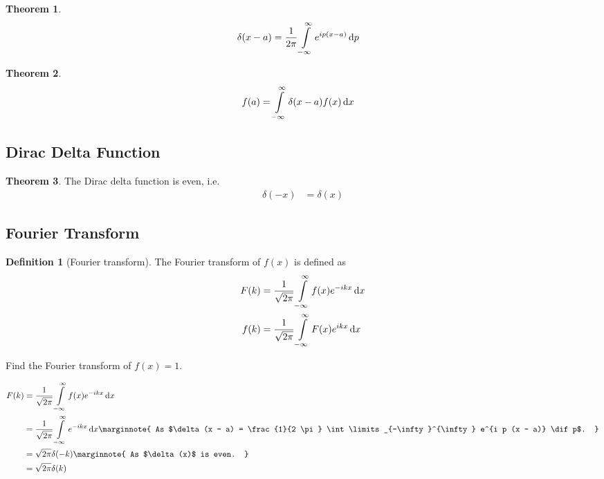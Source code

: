 \documentclass[titlepage, fleqn, a4paper, 12pt, twoside]{article}
\theoremstyle{definition}
\newtheorem{definition}{Definition}
\theoremstyle{theorem}
\newtheorem{theorem}{Theorem}
\begin{document}
\begin{theorem}
	\begin{align*}
		\delta(x - a) &= \frac{1}{2 \pi} \int\limits_{-\infty}^{\infty} e^{i p (x - a)} \dif p
	\end{align*}
\end{theorem}

\begin{theorem}
	\begin{align*}
		f(a) &= \int\limits_{-\infty}^{\infty} \delta(x - a) f(x) \dif x
	\end{align*}
\end{theorem}

\subsection{Dirac Delta Function}

\begin{theorem}
	The Dirac delta function is even, i.e.
	\begin{align*}
		\delta(-x) &= \delta(x)
	\end{align*}
\end{theorem}

\subsection{Fourier Transform}

\begin{definition}[Fourier transform]
	The Fourier transform of $f(x)$ is defined as
	\begin{align*}
		F(k) &= \frac{1}{\sqrt{2 \pi}} \int\limits_{-\infty}^{\infty} f(x) e^{-i k x} \dif x\\
		f(k) &= \frac{1}{\sqrt{2 \pi}} \int\limits_{-\infty}^{\infty} F(x) e^{i k x} \dif x
	\end{align*}
\end{definition}

\begin{question}
	Find the Fourier transform of $f(x) = 1$.
\end{question}

\begin{solution}
	\begin{align*}
		F(k) &= \frac{1}{\sqrt{2 \pi}} \int\limits_{-\infty}^{\infty} f(x) e^{-i k x} \dif x\\
		&= \frac{1}{\sqrt{2 \pi}} \int\limits_{-\infty}^{\infty} e^{-i k x} \dif x
		\marginnote
		{
			As $\delta(x - a) = \frac{1}{2 \pi} \int\limits_{-\infty}^{\infty} e^{i p (x - a)} \dif p$.
		}\\
		&= \sqrt{2 \pi} \delta(-k)
		\marginnote
		{
			As $\delta(x)$ is even.
		}\\
		&= \sqrt{2 \pi} \delta(k)
	\end{align*}
\end{solution}
\end{document}
